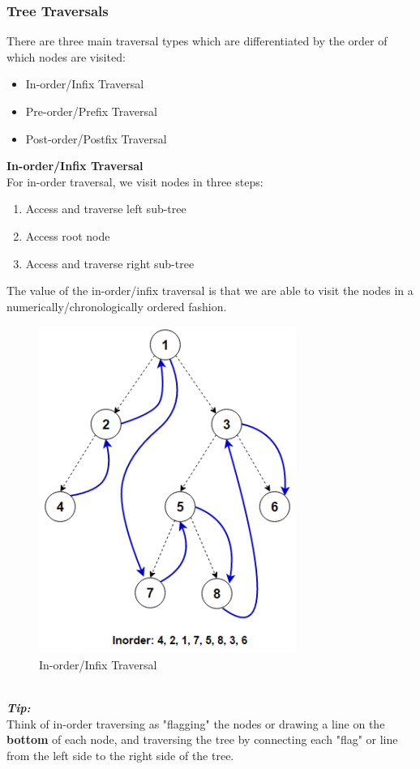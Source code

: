 \documentclass[hidelinks,11pt]{article}
\begin{document}
\subsubsection{Tree Traversals}
There are three main traversal types which are differentiated by the order of which nodes are visited:
\begin{itemize}
    \item In-order/Infix Traversal
    \item Pre-order/Prefix Traversal
    \item Post-order/Postfix Traversal
\end{itemize}
\textbf{In-order/Infix Traversal}\\
For in-order traversal, we visit nodes in three steps:
\begin{enumerate}
    \item Access and traverse left sub-tree
    \item Access root node
    \item Access and traverse right sub-tree
\end{enumerate}
The value of the in-order/infix traversal is that we are able to visit the nodes in a numerically/chronologically ordered fashion.
\begin{figure}[h!]
    \centering
    \includegraphics[scale=0.8]{infix.png}
    \caption{In-order/Infix Traversal}
\end{figure}\\
\textit{\textbf{Tip:}}\\
Think of in-order traversing as "flagging" the nodes or drawing a line on the \textbf{bottom} of each node, and traversing the tree by connecting each "flag" or line from the left side to the right side of the tree.\\[0.5\baselineskip]
\end{document}
